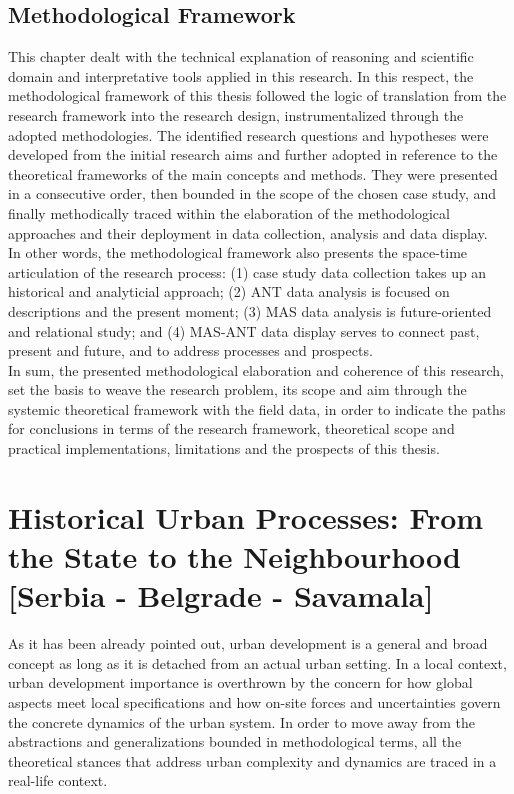 \documentclass[11pt]{report}
\begin{document}
\section{Methodological Framework}

This chapter dealt with the technical explanation of reasoning and scientific domain and interpretative tools applied in this research.
In this respect, the methodological framework of this thesis followed the logic of translation from the research framework into the research design, instrumentalized through the adopted methodologies.
The identified research questions and hypotheses were developed from the initial research aims and further adopted in reference to the theoretical frameworks of the main concepts and methods. 
They were presented in a consecutive order, then bounded in the scope of the chosen case study, and finally methodically traced within the elaboration of the methodological approaches and their deployment in data collection, analysis and data display.
\\
In other words, the methodological framework also presents the space-time articulation of the research process:
(1) case study data collection takes up an historical and analyticial approach;
(2) ANT data analysis is focused on descriptions and the present moment;
(3) MAS data analysis is future-oriented and relational study;
and
(4) MAS-ANT data display serves to connect past, present and future, and to address processes and prospects.
\\
In sum, the presented methodological elaboration and coherence of this research, set the basis to weave the research problem, its scope and aim through the systemic theoretical framework with the field data, in order to indicate the paths for conclusions in terms of the research framework, theoretical scope and practical implementations, limitations and the prospects of this thesis.



\chapter{Historical Urban Processes: From the State to the Neighbourhood [Serbia - Belgrade - Savamala]}

As it has been already pointed out, urban development is a general and broad concept as long as it is detached from an actual urban setting. In a local context, urban development importance is overthrown by the concern for how global aspects meet local specifications and how on-site forces and uncertainties govern the concrete dynamics of the urban system. In order to move away from the abstractions and generalizations bounded in methodological terms, all the theoretical stances that address urban complexity and dynamics are traced in a real-life context.
\\
\end{document}
